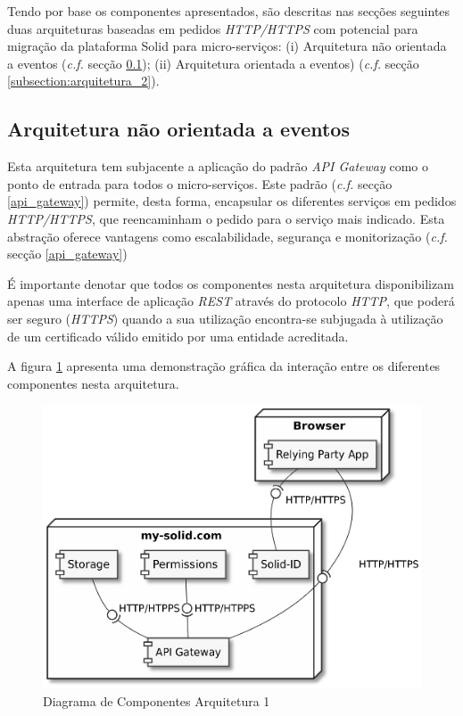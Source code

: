 Tendo por base os componentes apresentados, são descritas nas secções seguintes duas arquiteturas baseadas em pedidos \emph{HTTP/HTTPS} com potencial para migração da plataforma Solid para micro-serviços: (i) Arquitetura não orientada a eventos  (\emph{c.f.} secção \ref{subsection:arquitetura_1}); (ii) Arquitetura orientada a eventos) (\emph{c.f.} secção \ref{subsection:arquitetura_2}).

\subsection{Arquitetura não orientada a eventos} \label{subsection:arquitetura_1}

Esta arquitetura tem subjacente a aplicação do padrão \emph{API Gateway} como o ponto de entrada para todos o micro-serviços. Este padrão (\emph{c.f.} secção \ref{api_gateway}) permite, desta forma, encapsular os diferentes serviços em pedidos \emph{HTTP/HTTPS}, que reencaminham o pedido para o serviço mais indicado. Esta abstração oferece vantagens como escalabilidade, segurança e monitorização (\emph{c.f.} secção \ref{api_gateway})

É importante denotar que todos os componentes nesta arquitetura disponibilizam apenas uma interface de aplicação \emph{\acrshort{REST}} através do protocolo \emph{HTTP}, que poderá ser seguro (\emph{HTTPS}) quando a sua utilização encontra-se subjugada à utilização de um certificado válido emitido por uma entidade acreditada.

A figura \ref{component_diagram_arquitetura1} apresenta uma demonstração gráfica da interação entre os diferentes componentes nesta arquitetura.

\begin{figure}[H]
    \begin{center}
    \includegraphics[width=0.6 \textwidth]{figures/arquitetura_1_diagrama_componentes.eps}
    \caption{Diagrama de Componentes Arquitetura 1}
    \label{component_diagram_arquitetura1}
    \end{center}
\end{figure}

